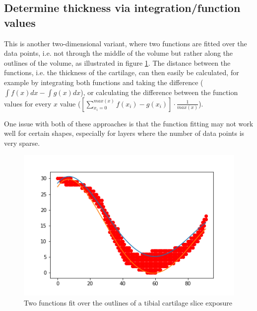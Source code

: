 \subsection{Determine thickness via integration/function values}
This is another two-dimensional variant, where two functions are fitted over the data points, i.e. not through the middle of the volume but rather along the outlines of the volume, as illustrated in figure \ref{fig:integration}. The distance between the functions, i.e. the thickness of the cartilage, can then easily be calculated, for example by integrating both functions and taking the difference ($\int f(x) dx - \int g(x) dx$), or calculating the difference between the function values for every $x$ value ($[\sum_{x_i = 0}^{max(x)} f(x_i) - g(x_i)] \cdot \frac{1}{max(x)}$).
\par
One issue with both of these approaches is that the function fitting may not work well for certain shapes, especially for layers where the number of data points is very sparse.
\begin{figure}[htb!]
	\centering
	\includegraphics[width=\linewidth]{./figures/integration}
	\caption{Two functions fit over the outlines of a tibial cartilage slice exposure}
	\label{fig:integration}
\end{figure}